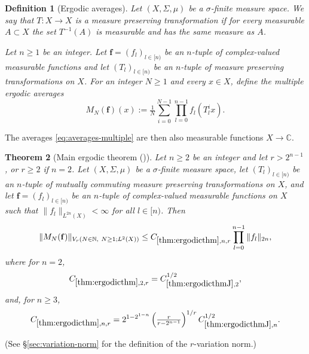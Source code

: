 \documentclass[12pt,reqno]{amsart}
\newcommand{\auto}{{({\tiny\faCar})}}
\theoremstyle{plain}
\newtheorem{theorem}{Theorem}[section]
\newtheorem{definition}[theorem]{Definition}
\numberwithin{equation}{section}
\theoremstyle{remark}
\newcommand{\N}{{\mathbb N}}
\newcommand{\C}{{\mathbb C}}
\newcommand{\jr}[1]{{\color{orange}{[J: #1]}}}
\begin{document}
\begin{definition}[Ergodic averages]\label{ergodic averages}
Let $(X,\Sigma,\mu)$ be a $\sigma$-finite measure space. We say that $T: X \to X$ is a measure preserving transformation if for every measurable $A\subset X$ the set $T^{-1}(A)$ is measurable and has the
same measure as $A$.

Let $n\geq 1$ be an integer. Let $\mathbf{f}=(f_l)_{l\in [n)}$ be an $n$-tuple of complex-valued measurable functions  and let $(T_l)_{l\in [n)}$ be an $n$-tuple of measure preserving transformations on $X$. For an integer $N\geq 1$ and every $x\in X$, define the multiple ergodic averages
\begin{equation}\label{eq:averages-multiple}
M_{N}(\mathbf{f})(x) := \tfrac{1}{N}\sum_{i=0}^{N-1} \prod_{l=0}^{n-1} f_l(T_l^i x).
\end{equation}
\end{definition}


The averages \eqref{eq:averages-multiple} are then also measurable functions $X\to \C$.

\begin{theorem}[Main ergodic theorem \auto]\label{thm:ergodicthm}
Let $n\ge 2$ be an integer and let $r>2^{n-1}$, or $r\ge 2$ if $n=2$. Let $(X,\Sigma,\mu)$ be a $\sigma$-finite measure space, let $(T_l)_{l\in [n)}$ be an $n$-tuple of mutually commuting measure preserving transformations on $X$, and let $\mathbf{f}=(f_l)_{l\in [n)}$ be an $n$-tuple of complex-valued measurable functions on $X$ such that $\|f_l\|_{L^{2n}(X)}<\infty$ for all $l\in[n)$. Then
\begin{equation}\label{main ergodic variation estimate}
 \| M_{N} (\mathbf{f}) \|_{V_{r}(N\in\N,\ N\ge1; L^2(X))}
\le C_{\ref{thm:ergodicthm},n,r}
 \prod_{l=0}^{n-1} \|f_l\|_{2n},
\end{equation}
where \jr{GPT: Please inline these constant definitions (no displays), and also in the rest of the manuscript: if there are more than one line defining constants, then inline them}
for $n=2$,
\begin{equation}\label{main ergodic theorem constant}
C_{\ref{thm:ergodicthm},2,r}
=C_{\ref{thm:ergodicthmJ},2}^{1/2},
\end{equation}
and, for $n\ge3$,
\begin{equation}\label{auto:main-ergodic-theorem-constant-higher-rank}
C_{\ref{thm:ergodicthm},n,r}
=2^{1-2^{1-n}}\left(\tfrac{r}{r-2^{n-1}}\right)^{1/r}C_{\ref{thm:ergodicthmJ},n}^{1/2}.
\end{equation}
\end{theorem}
(See \S \ref{sec:variation-norm} for the definition of the $r$-variation norm.)
\end{document}
